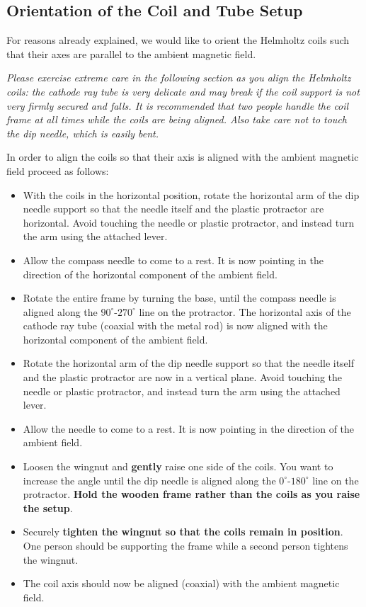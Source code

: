 \subsection{Orientation of the Coil and Tube Setup}

For reasons already explained, we would like to orient the Helmholtz coils such that their axes are parallel to the ambient magnetic field.\myskip

\emph{Please exercise extreme care in the following section as you align the Helmholtz coils: the cathode ray tube is very delicate and may break if the coil support is not very firmly secured and falls.  It is recommended that two people handle the coil frame at all times while the coils are being aligned.  Also take care not to touch the dip needle, which is easily bent.}\myskip

In order to align the coils so that their axis is aligned with the ambient magnetic field proceed as follows:
\begin{itemize}
    \item With the coils in the horizontal position, rotate the horizontal arm of the dip needle support so that the needle itself and the plastic protractor are horizontal.  Avoid touching the needle or plastic protractor, and instead turn the arm using the attached lever.
    \item Allow the compass needle to come to a rest.  It is now pointing in the direction of the horizontal component of the ambient field.
    \item Rotate the entire frame by turning the base, until the compass needle is aligned along the $90^\circ$-$270^\circ$ line on the protractor.  The horizontal axis of the cathode ray tube (coaxial with the metal rod) is now aligned with the horizontal component of the ambient field.
    \item Rotate the horizontal arm of the dip needle support so that the needle itself and the plastic protractor are now in a vertical plane.  Avoid touching the needle or plastic protractor, and instead turn the arm using the attached lever.
    \item Allow the needle to come to a rest.  It is now pointing in the direction of the ambient field.
    \item Loosen the wingnut and \textbf{gently} raise one side of the coils.  You want to increase the angle until the dip needle is aligned along the $0^\circ$-$180^\circ$ line on the protractor.  \textbf{Hold the wooden frame rather than the coils as you raise the setup}.
    \item Securely \textbf{tighten the wingnut so that the coils remain in position}.  One person should be supporting the frame while a second person tightens the wingnut.
    \item The coil axis should now be aligned (coaxial) with the ambient magnetic field.
\end{itemize}

